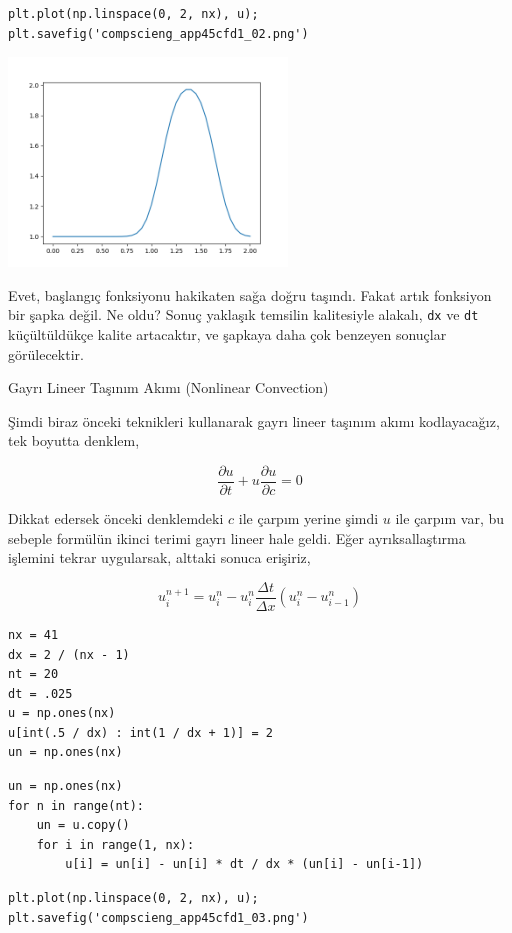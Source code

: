 \documentclass[12pt,fleqn]{article}\usepackage{../../common}
\begin{document}
\begin{verbatim}
plt.plot(np.linspace(0, 2, nx), u);
plt.savefig('compscieng_app45cfd1_02.png')
\end{verbatim}

\includegraphics[width=20em]{compscieng_app45cfd1_02.png}

Evet, başlangıç fonksiyonu hakikaten sağa doğru taşındı. Fakat artık fonksiyon
bir şapka değil. Ne oldu? Sonuç yaklaşık temsilin kalitesiyle alakalı, \verb!dx!
ve \verb!dt! küçültüldükçe kalite artacaktır, ve şapkaya daha çok benzeyen
sonuçlar görülecektir. 

Gayrı Lineer Taşınım Akımı (Nonlinear Convection)

Şimdi biraz önceki teknikleri kullanarak gayrı lineer taşınım akımı
kodlayacağız, tek boyutta denklem,

$$
\frac{\partial u}{\partial t} +
u  \frac{\partial u}{\partial c}  = 0
$$

Dikkat edersek önceki denklemdeki $c$ ile çarpım yerine şimdi $u$ ile çarpım
var, bu sebeple formülün ikinci terimi gayrı lineer hale geldi. Eğer
ayrıksallaştırma işlemini tekrar uygularsak, alttaki sonuca erişiriz,

$$
u_i^{n+1} = u_i^n -  u_i^n \frac{\Delta t}{\Delta x} ( u_i^n - u_{i-1}^n )
$$

\begin{verbatim}
nx = 41
dx = 2 / (nx - 1)
nt = 20
dt = .025 
u = np.ones(nx)
u[int(.5 / dx) : int(1 / dx + 1)] = 2  
un = np.ones(nx)
\end{verbatim}

\begin{verbatim}
un = np.ones(nx)
for n in range(nt):
    un = u.copy() 
    for i in range(1, nx):
        u[i] = un[i] - un[i] * dt / dx * (un[i] - un[i-1])        
\end{verbatim}

\begin{verbatim}
plt.plot(np.linspace(0, 2, nx), u);
plt.savefig('compscieng_app45cfd1_03.png')
\end{verbatim}
\end{document}
